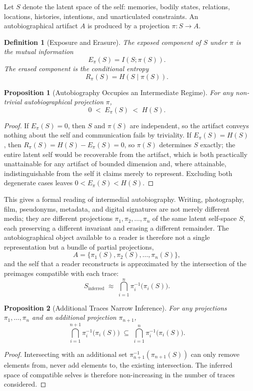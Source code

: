\documentclass[11pt]{article}
\theoremstyle{plain}
\newtheorem{definition}{Definition}[section]
\newtheorem{proposition}{Proposition}[section]
\begin{document}
Let $S$ denote the latent space of the self: memories, bodily states, relations, locations, histories, intentions, and unarticulated constraints. An autobiographical artifact $A$ is produced by a projection $\pi : S \to A$.

\begin{definition}[Exposure and Erasure]
The exposed component of $S$ under $\pi$ is the mutual information
\[
E_\pi(S) = I(S; \pi(S)).
\]
The erased component is the conditional entropy
\[
R_\pi(S) = H(S \mid \pi(S)).
\]
\end{definition}

\begin{proposition}[Autobiography Occupies an Intermediate Regime]
For any non-trivial autobiographical projection $\pi$,
\[
0 \;<\; E_\pi(S) \;<\; H(S).
\]
\end{proposition}
\begin{proof}
If $E_\pi(S) = 0$, then $S$ and $\pi(S)$ are independent, so the artifact conveys nothing about the self and communication fails by triviality. If $E_\pi(S) = H(S)$, then $R_\pi(S) = H(S) - E_\pi(S) = 0$, so $\pi(S)$ determines $S$ exactly; the entire latent self would be recoverable from the artifact, which is both practically unattainable for any artifact of bounded dimension and, where attainable, indistinguishable from the self it claims merely to represent. Excluding both degenerate cases leaves $0 < E_\pi(S) < H(S)$.
\end{proof}

This gives a formal reading of intermedial autobiography. Writing, photography, film, pseudonyms, metadata, and digital signatures are not merely different media; they are different projections $\pi_1, \pi_2, \ldots, \pi_n$ of the same latent self-space $S$, each preserving a different invariant and erasing a different remainder. The autobiographical object available to a reader is therefore not a single representation but a bundle of partial projections,
\[
A = \{\pi_1(S), \pi_2(S), \ldots, \pi_n(S)\},
\]
and the self that a reader reconstructs is approximated by the intersection of the preimages compatible with each trace:
\[
S_{\mathrm{inferred}} \;\approx\; \bigcap_{i=1}^n \pi_i^{-1}\big(\pi_i(S)\big).
\]

\begin{proposition}[Additional Traces Narrow Inference]
For any projections $\pi_1,\ldots,\pi_n$ and an additional projection $\pi_{n+1}$,
\[
\bigcap_{i=1}^{n+1} \pi_i^{-1}\big(\pi_i(S)\big) \;\subseteq\; \bigcap_{i=1}^{n} \pi_i^{-1}\big(\pi_i(S)\big).
\]
\end{proposition}
\begin{proof}
Intersecting with an additional set $\pi_{n+1}^{-1}(\pi_{n+1}(S))$ can only remove elements from, never add elements to, the existing intersection. The inferred space of compatible selves is therefore non-increasing in the number of traces considered.
\end{proof}
\end{document}
